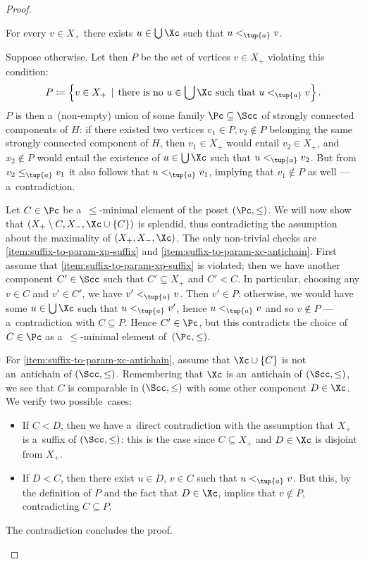 \begin{proof}
    \begin{claim}
        \label{cl:indset-union-is-covering}
        For every $v \in X_+$ there exists $u \in \bigcup \Xc$ such that $u <_{\tup{a}} v$.
    \end{claim}
    \begin{claimproof}
        Suppose otherwise.
        Let then $P$ be the set of vertices $v \in X_+$ violating this condition: \[P \coloneqq  \left\{v \in X_+ \,\mid\, \textrm{there is no }u\in \bigcup \Xc\textrm{ such that } u <_{\tup{a}} v\right\}.\]
        $P$ is then a~(non-empty) union of some family $\Pc \subseteq \Scc$ of strongly connected components of $H$: if there existed two vertices $v_1 \in P, v_2 \notin P$ belonging the same strongly connected component of $H$, then $v_1\in X_+$ would entail $v_2\in X_+$, and $x_2\notin P$ would entail the existence of $u \in \bigcup \Xc$ such that $u <_{\tup{a}} v_2$.
        But from $v_2 \leq_{\tup{a}} v_1$ it also follows that $u <_{\tup{a}} v_1$, implying that $v_1 \notin P$ as well --- a~contradiction.

        Let $C \in \Pc$ be a~$\leq$-minimal element of the poset $(\Pc, \leq)$.
        We will now show that $(X_+ \setminus C, X_-, \Xc \cup \{C\})$ is splendid, thus contradicting the assumption about the maximality of $(X_+, X_-, \Xc)$.
        The only non-trivial checks are \ref{item:suffix-to-param-xp-suffix} and \ref{item:suffix-to-param-xc-antichain}.
        First assume that \ref{item:suffix-to-param-xp-suffix} is violated; then we have another component $C' \in \Scc$ such that $C' \subseteq X_+$ and $C' < C$.
        In particular, choosing any $v \in C$ and $v' \in C'$, we have $v' <_{\tup{a}} v$.
        Then $v' \in P$: otherwise, we would have some $u \in \bigcup \Xc$ such that $u <_{\tup{a}} v'$, hence $u <_{\tup{a}} v$ and so $v \notin P$ --- a~contradiction with $C \subseteq P$.
        Hence $C' \in \Pc$, but this contradicts the choice of $C \in \Pc$ as a~$\leq$-minimal element of~$(\Pc, \leq)$.
        
        For \ref{item:suffix-to-param-xc-antichain}, assume that $\Xc \cup \{C\}$ is not an~antichain of $(\Scc, \leq)$.
        Remembering that $\Xc$ is an~antichain of $(\Scc, \leq)$, we see that $C$ is comparable in $(\Scc, \leq)$ with some other component $D \in \Xc$.
        We verify two possible~cases:
        \begin{itemize}[nosep]
            \item If $C < D$, then we have a~direct contradiction with the assumption that $X_+$ is a~suffix of $(\Scc, \leq)$: this is the case since $C    \subseteq X_+$ and $D \in \Xc$ is disjoint from $X_+$.
            \item If $D < C$, then there exist $u \in D$, $v \in C$ such that $u <_{\tup{a}} v$.
                But this, by the definition of $P$ and the fact that $D \in \Xc$, implies that $v \notin P$, contradicting $C \subseteq P$.
        \end{itemize}
        The contradiction concludes the proof.
    \end{claimproof}


\end{proof}

